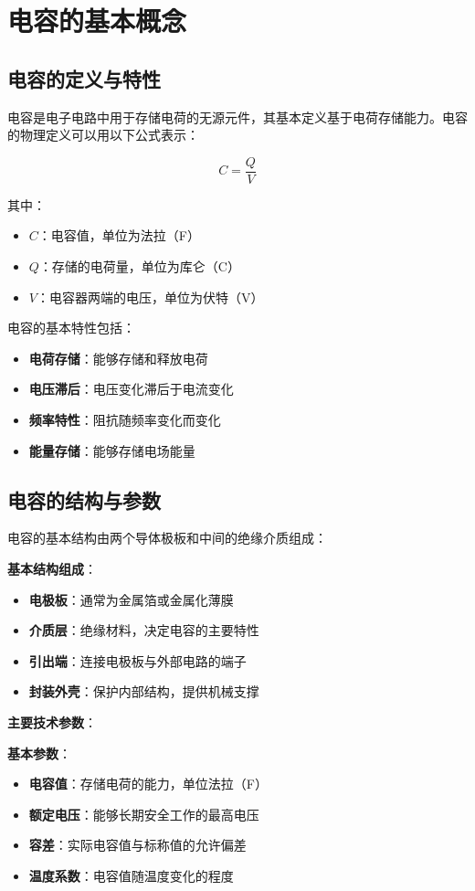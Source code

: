 \documentclass[12pt,UTF8]{ctexbook}
\begin{document}
\section{电容的基本概念}

\subsection{电容的定义与特性}

电容是电子电路中用于存储电荷的无源元件，其基本定义基于电荷存储能力。电容的物理定义可以用以下公式表示：

\[ C = \frac{Q}{V} \]

其中：
\begin{itemize}[leftmargin=3.5em]
    \item $C$：电容值，单位为法拉（F）
    \item $Q$：存储的电荷量，单位为库仑（C）
    \item $V$：电容器两端的电压，单位为伏特（V）
\end{itemize}

电容的基本特性包括：
\begin{itemize}[leftmargin=3.5em]
    \item \textbf{电荷存储}：能够存储和释放电荷
    \item \textbf{电压滞后}：电压变化滞后于电流变化
    \item \textbf{频率特性}：阻抗随频率变化而变化
    \item \textbf{能量存储}：能够存储电场能量
\end{itemize}

\subsection{电容的结构与参数}

电容的基本结构由两个导体极板和中间的绝缘介质组成：

\textbf{基本结构组成}：
\begin{itemize}[leftmargin=3.5em]
    \item \textbf{电极板}：通常为金属箔或金属化薄膜
    \item \textbf{介质层}：绝缘材料，决定电容的主要特性
    \item \textbf{引出端}：连接电极板与外部电路的端子
    \item \textbf{封装外壳}：保护内部结构，提供机械支撑
\end{itemize}

\textbf{主要技术参数}：

\textbf{基本参数}：
\begin{itemize}[leftmargin=3.5em]
    \item \textbf{电容值}：存储电荷的能力，单位法拉（F）
    \item \textbf{额定电压}：能够长期安全工作的最高电压
    \item \textbf{容差}：实际电容值与标称值的允许偏差
    \item \textbf{温度系数}：电容值随温度变化的程度
\end{itemize}
\end{document}
